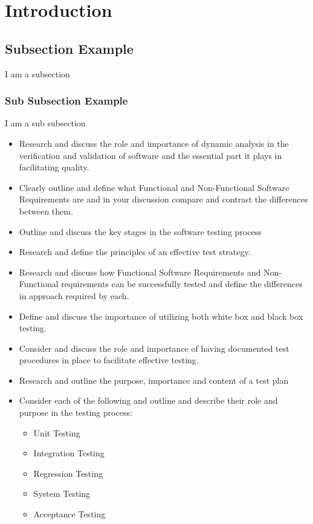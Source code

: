 \documentclass[12pt]{article}
\begin{document}
\section{Introduction}
\subsection{Subsection Example}
I am a subsection
\subsubsection{Sub Subsection Example}
I am a sub subsection
\pagebreak

\begin{itemize}
    \item{Research and discuss the role and importance of dynamic analysis in the verification and validation of software and the essential part it plays in facilitating quality.}
    \item{Clearly outline and define what Functional and Non-Functional Software Requirements are and in your discussion compare and contrast the differences between them.}
    \item{Outline and discuss the key stages in the software testing process}
    \item{Research and define the principles of an effective test strategy.}
    \item{Research and discuss how Functional Software Requirements and Non- Functional requirements can be successfully tested and define the differences in approach required by each.}
    \item{Define and discuss the importance of utilizing both white box and black box testing.}
    \item{Consider and discuss the role and importance of having documented test procedures in place to facilitate effective testing.}
    \item{Research and outline the purpose, importance and content of a test plan}
    \item{Consider each of the following and outline and describe their role and
    purpose in the testing process:}
        \begin{itemize}
        \item{Unit Testing}
        \item{Integration Testing}
        \item{Regression Testing}
        \item{System Testing}
        \item{Acceptance Testing}
        \end{itemize}
\end{itemize}
\end{document}

